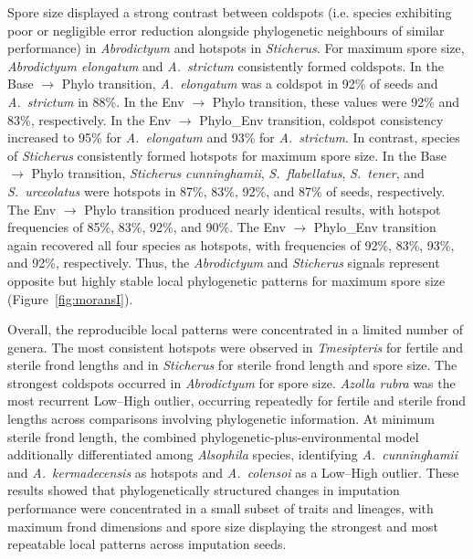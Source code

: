 \documentclass[preprint,12pt,authoryear]{elsarticle}
\begin{document}
Spore size displayed a strong contrast between coldspots (i.e. species exhibiting poor or negligible error reduction alongside phylogenetic neighbours of similar performance) in \textit{Abrodictyum} and hotspots in \textit{Sticherus}. For maximum spore size, \textit{Abrodictyum elongatum} and \textit{A.~strictum} consistently formed coldspots. In the Base $\rightarrow$ Phylo transition, \textit{A.~elongatum} was a coldspot in 92\% of seeds and \textit{A.~strictum} in 88\%. In the Env $\rightarrow$ Phylo transition, these values were 92\% and 83\%, respectively. In the Env $\rightarrow$ Phylo\_Env transition, coldspot consistency increased to 95\% for \textit{A.~elongatum} and 93\% for \textit{A.~strictum}. In contrast, species of \textit{Sticherus} consistently formed hotspots for maximum spore size. In the Base $\rightarrow$ Phylo transition, \textit{Sticherus cunninghamii}, \textit{S.~flabellatus}, \textit{S.~tener}, and \textit{S.~urceolatus} were hotspots in 87\%, 83\%, 92\%, and 87\% of seeds, respectively. The Env $\rightarrow$ Phylo transition produced nearly identical results, with hotspot frequencies of 85\%, 83\%, 92\%, and 90\%. The Env $\rightarrow$ Phylo\_Env transition again recovered all four species as hotspots, with frequencies of 92\%, 83\%, 93\%, and 92\%, respectively. Thus, the \textit{Abrodictyum} and \textit{Sticherus} signals represent opposite but highly stable local phylogenetic patterns for maximum spore size (Figure~\ref{fig:moransI}).

Overall, the reproducible local patterns were concentrated in a limited number of genera. The most consistent hotspots were observed in \textit{Tmesipteris} for fertile and sterile frond lengths and in \textit{Sticherus} for sterile frond length and spore size. The strongest coldspots occurred in \textit{Abrodictyum} for spore size. \textit{Azolla rubra} was the most recurrent Low--High outlier, occurring repeatedly for fertile and sterile frond lengths across comparisons involving phylogenetic information. At minimum sterile frond length, the combined phylogenetic-plus-environmental model additionally differentiated among \textit{Alsophila} species, identifying \textit{A.~cunninghamii} and \textit{A.~kermadecensis} as hotspots and \textit{A.~colensoi} as a Low--High outlier. These results showed that phylogenetically structured changes in imputation performance were concentrated in a small subset of traits and lineages, with maximum frond dimensions and spore size displaying the strongest and most repeatable local patterns across imputation seeds.
\end{document}

